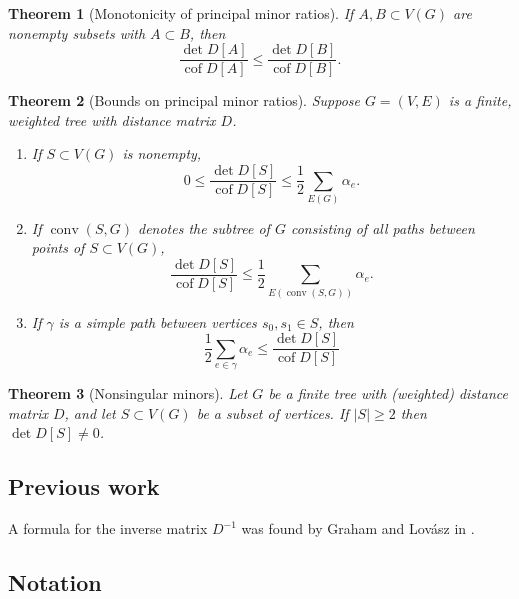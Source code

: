 \documentclass{amsart}
\newtheorem{thm}{Theorem}
\theoremstyle{definition}
\DeclareMathOperator{\cof}{cof}
\DeclareMathOperator{\conv}{conv}
\begin{document}
\begin{thm}[Monotonicity of principal minor ratios]
\label{thm:monotonic}
If $A,B \subset V(G)$
are nonempty subsets with
$A \subset B$,
then
\begin{equation*}
	\frac{\det D[A]}{\cof D[A]}  \leq \frac{\det D[B]}{\cof D[B]}.
\end{equation*}
\end{thm}

\begin{thm}[Bounds on principal minor ratios]
Suppose $G = (V,E)$ is a finite, weighted tree with distance matrix $D$.
\begin{enumerate}
\item 
If $S \subset V(G)$ is nonempty,
\begin{equation*}
0 \leq \frac{\det D[S]}{\cof D[S]} \leq \frac12 \sum_{E(G)} \alpha_e .
\end{equation*}

\item 
If $\conv(S,G)$ denotes the subtree of $G$ consisting of all paths between points of $S \subset V(G)$,
\begin{equation*}
 \frac{\det D[S]}{\cof D[S]} \leq \frac12 \sum_{E(\conv(S, G))} \alpha_e .
\end{equation*}

\item 
If $\gamma$ is a simple path between vertices $s_0, s_1 \in S$, then
\begin{equation*}
	\frac12 \sum_{e \in \gamma} \alpha_e \leq \frac{\det D[S]}{\cof D[S]}
\end{equation*}
\end{enumerate}
\end{thm}

\begin{thm}[Nonsingular minors]
Let $G$ be a finite tree
with (weighted) distance matrix $D$,
and let $S \subset V(G)$ be a subset of vertices.
If $|S|\geq 2$ then $\det D[S] \neq 0$.
\end{thm}

\subsection{Previous work} 
A formula for the inverse matrix $D^{-1}$ was found by Graham and Lov\'{a}sz in \cite{graham-lovasz}.

\subsection{Notation}
\end{document}
